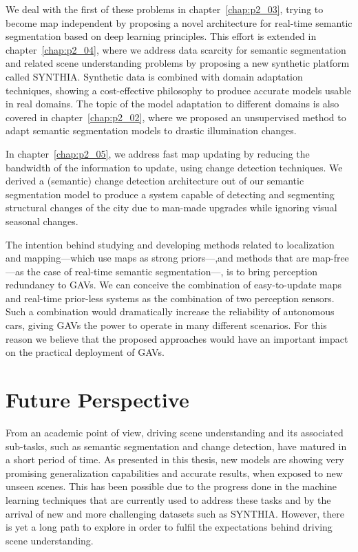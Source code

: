 We deal with the first of these problems in chapter~\ref{chap:p2_03}, trying to become map independent by proposing a novel architecture for real-time semantic segmentation based on deep learning principles. This effort is extended in chapter~\ref{chap:p2_04}, where we address data scarcity for semantic segmentation and related scene understanding problems by proposing a new synthetic platform called SYNTHIA. Synthetic data is combined with domain adaptation techniques, showing a cost-effective philosophy to produce accurate models usable in real domains. The topic of the model adaptation to different domains is also covered in chapter~\ref{chap:p2_02}, where we proposed an unsupervised method to adapt semantic segmentation models to drastic illumination changes.

In chapter~\ref{chap:p2_05}, we address fast map updating by reducing the bandwidth of the information to update, using change detection techniques. We derived a (semantic) change detection architecture out of our semantic segmentation model to produce a system capable of detecting and segmenting structural changes of the city due to man-made upgrades while ignoring visual seasonal changes. 

The intention behind studying and developing methods related to localization and mapping---which use maps as strong priors---,and methods that are map-free---as the case of real-time semantic segmentation---, is to bring perception redundancy to GAVs. We can conceive the combination of easy-to-update maps and real-time prior-less systems as the combination of two perception sensors. Such a combination would dramatically increase the reliability of autonomous cars, giving GAVs the power to operate in many different scenarios. For this reason we believe that the proposed approaches would have an important impact on the practical deployment of GAVs.



\section{Future Perspective}

From an academic point of view, driving scene understanding and its associated sub-tasks, such as semantic segmentation and change detection, have matured in a short period of time. As presented in this thesis, new models are showing very promising generalization capabilities and accurate results, when exposed to new unseen scenes. This has been possible due to the progress done in the machine learning techniques that are currently used to address these tasks and by the arrival of new and more challenging datasets such as SYNTHIA. However, there is yet a long path to explore in order to fulfil the expectations behind driving scene understanding.

